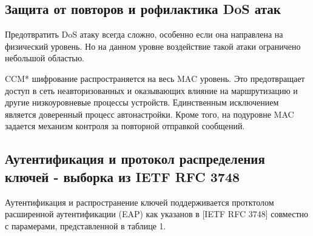 \subsection{Защита от повторов и рофилактика DoS атак}

Предотвратить DoS атаку всегда сложно, особенно если она направлена на физический уровень. Но на данном уровне воздействие такой атаки ограничено небольшой областью.

CCM* шифрование распространяется на весь MAC уровень. Это предотвращает доступ в сеть неавторизованных и оказывающих влияние на маршрутизацию и другие низкоуровневые процессы устройств. Единственным исключением является доверенный процесс автонастройки. Кроме того, на подуровне MAC задается механизм контроля за повторной отправкой сообщений.

\subsection{Аутентификация и протокол распределения ключей - выборка из IETF RFC 3748}

Аутентификация и распространение ключей поддерживается протктолом расширенной аутентификации (EAP) как указанов в [IETF RFC 3748] совместно с парамерами, представленной в таблице 1.%

